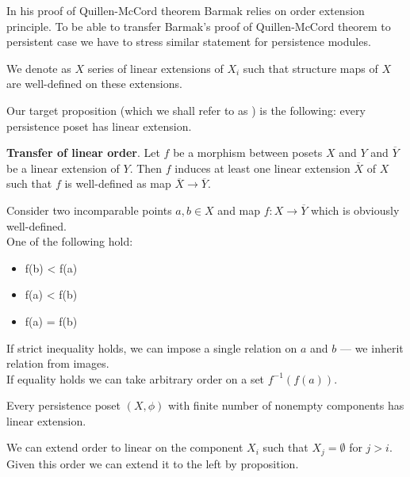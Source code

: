 In his proof of Quillen-McCord theorem Barmak relies on order extension principle. To be able to transfer Barmak's proof of Quillen-McCord theorem to persistent case we have to stress similar statement for persistence modules.

\begin{definition}
  We denote as  $X$ series of linear extensions of $X_i$ such that structure maps of $X$ are well-defined on these extensions.
\end{definition}

Our target proposition (which we shall refer to as ) is the following: every persistence poset has linear extension.

\begin{proposition}
  \textbf{Transfer of linear order}. Let $f$ be a morphism between posets $X$ and $Y$ and $\overline{Y}$ be a linear extension of $Y$. Then $f$ induces at least one linear extension $\overline{X}$ of $X$ such that $f$ is well-defined as map $\overline{X} \to \overline{Y}$.
\end{proposition}

\begin{pf}
  Consider two incomparable points $a, b \in X$ and map $f : X \to \overline{Y}$ which is obviously well-defined.\\
  One of the following hold:\\
  \begin{itemize}
    \item f(b) < f(a)
    \item f(a) < f(b)
    \item f(a) = f(b)
  \end{itemize}
  If strict inequality holds, we can impose a single relation on $a$ and $b$ --- we inherit relation from images.\\
  If equality holds we can take arbitrary order on a set $f^{-1}(f(a))$.
\end{pf}

\begin{corollary}
  Every persistence poset $(X,\phi)$ with finite number of nonempty components has linear extension.
\end{corollary}

\begin{pf}
  We can extend order to linear on the component $X_i$ such that $X_j = \emptyset$ for $j > i$. Given this order we can extend it to the left by proposition.
\end{pf}

